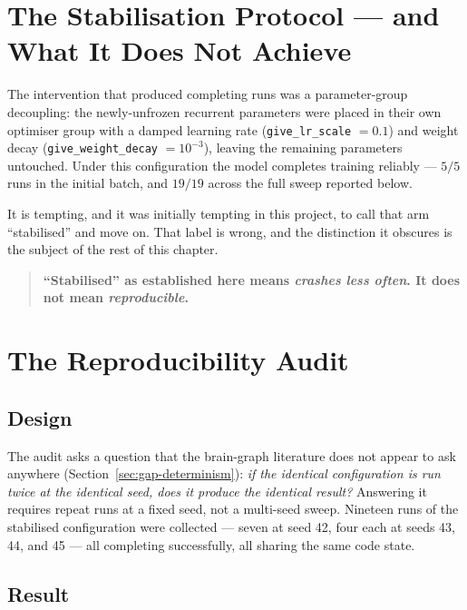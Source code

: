\section{The Stabilisation Protocol --- and What It Does Not Achieve}
\label{sec:btgt-repair}

The intervention that produced completing runs was a parameter-group decoupling: the
newly-unfrozen recurrent parameters were placed in their own optimiser group with a damped
learning rate (\texttt{give\_lr\_scale} $= 0.1$) and weight decay
(\texttt{give\_weight\_decay} $= 10^{-3}$), leaving the remaining parameters untouched.
Under this configuration the model completes training reliably --- $5/5$ runs in the
initial batch, and $19/19$ across the full sweep reported below.

It is tempting, and it was initially tempting in this project, to call that arm
``stabilised'' and move on. That label is wrong, and the distinction it obscures is the
subject of the rest of this chapter.

\begin{quote}
  \textbf{``Stabilised'' as established here means \emph{crashes less often}. It does not
  mean \emph{reproducible}.}
\end{quote}

\section{The Reproducibility Audit}
\label{sec:btgt-reproducibility}

\subsection{Design}

The audit asks a question that the brain-graph literature does not appear to ask anywhere
(Section~\ref{sec:gap-determinism}): \emph{if the identical configuration is run twice at
the identical seed, does it produce the identical result?} Answering it requires repeat
runs at a fixed seed, not a multi-seed sweep. Nineteen runs of the stabilised configuration
were collected --- seven at seed 42, four each at seeds 43, 44, and 45 --- all completing
successfully, all sharing the same code state.

\subsection{Result}

